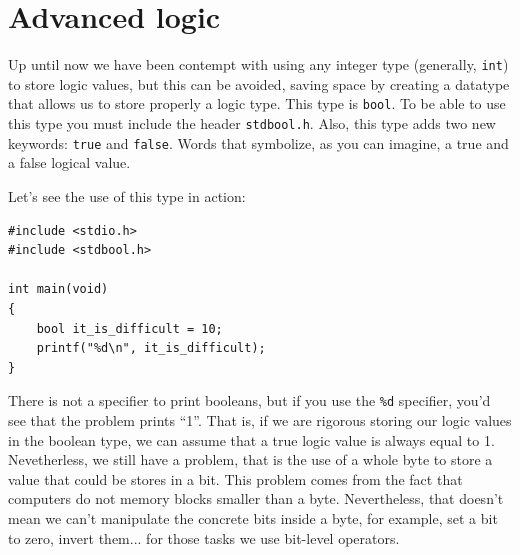 \documentclass[a4paper]{article}
\begin{document}
\section{Advanced logic}
Up until now we have been contempt with using any integer type (generally,
\verb!int!) to store logic values, but this can be avoided, saving space by
creating a datatype that allows us to store properly a logic type. This type is
\verb!bool!. To be able to use this type you must include the header
\verb!stdbool.h!. Also, this type adds two new keywords: \verb!true! and
\verb!false!. Words that symbolize, as you can imagine, a true and a false
logical value.

Let's see the use of this type in action:

\noindent
\begin{minipage}[H]{\linewidth}
\mbox{}
\begin{lstlisting}[style=C,
caption={Example of us of \texttt{bool}},
label={lst:bool1}]
#include <stdio.h>
#include <stdbool.h>

int main(void)
{
    bool it_is_difficult = 10;
    printf("%d\n", it_is_difficult);
}
\end{lstlisting}
\end{minipage}

There is not a specifier to print booleans, but if you use the \verb!%d!
specifier, you'd see that the problem prints ``1''. That is, if we are rigorous
storing our logic values in the boolean type, we can assume that a true logic
value is always equal to 1. Nevetherless, we still have a problem, that is the
use of a whole byte to store a value that could be stores in a bit. This problem
comes from the fact that computers do not memory blocks smaller than a byte.
Nevertheless, that doesn't mean we can't manipulate the concrete bits inside a
byte, for example, set a bit to zero, invert them... for those tasks we use
bit-level operators.
\end{document}
